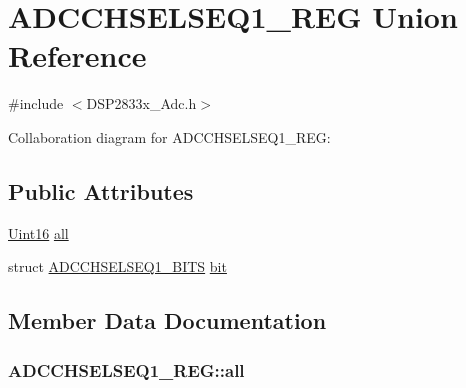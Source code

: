 \hypertarget{union_a_d_c_c_h_s_e_l_s_e_q1___r_e_g}{}\section{A\+D\+C\+C\+H\+S\+E\+L\+S\+E\+Q1\+\_\+\+R\+E\+G Union Reference}
\label{union_a_d_c_c_h_s_e_l_s_e_q1___r_e_g}


{\ttfamily \#include $<$D\+S\+P2833x\+\_\+\+Adc.\+h$>$}



Collaboration diagram for A\+D\+C\+C\+H\+S\+E\+L\+S\+E\+Q1\+\_\+\+R\+E\+G\+:
\subsection*{Public Attributes}
\begin{DoxyCompactItemize}
\item 
\hyperlink{_d_s_p2833x___device_8h_a59a9f6be4562c327cbfb4f7e8e18f08b}{Uint16} \hyperlink{union_a_d_c_c_h_s_e_l_s_e_q1___r_e_g_ad2ab4ec98875050992f077b4989509b8}{all}
\item 
struct \hyperlink{struct_a_d_c_c_h_s_e_l_s_e_q1___b_i_t_s}{A\+D\+C\+C\+H\+S\+E\+L\+S\+E\+Q1\+\_\+\+B\+I\+T\+S} \hyperlink{union_a_d_c_c_h_s_e_l_s_e_q1___r_e_g_a50afc620712a83c81db033bfa4a431f7}{bit}
\end{DoxyCompactItemize}


\subsection{Member Data Documentation}
\hypertarget{union_a_d_c_c_h_s_e_l_s_e_q1___r_e_g_ad2ab4ec98875050992f077b4989509b8}{}
\subsubsection[{all}]{ A\+D\+C\+C\+H\+S\+E\+L\+S\+E\+Q1\+\_\+\+R\+E\+G\+::all}\label{union_a_d_c_c_h_s_e_l_s_e_q1___r_e_g_ad2ab4ec98875050992f077b4989509b8}
\hypertarget{union_a_d_c_c_h_s_e_l_s_e_q1___r_e_g_a50afc620712a83c81db033bfa4a431f7}{}
